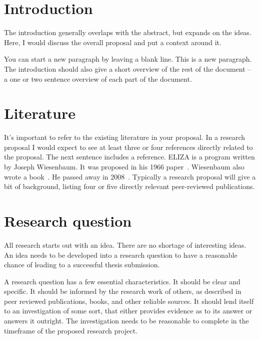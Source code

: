   \section{Introduction}
    The introduction generally overlaps with the abstract, but expands
    on the ideas. Here, I would discuss the overall proposal and put a context
    around it.
    
    You can start a new paragraph by leaving a blank line. This is a new
    paragraph.
    The introduction should also give a short overview of the rest of the
    document -- a one or two sentence overview of each part of the document.

  \section{Literature}
    It's important to refer to the existing literature in your proposal. In a
    research proposal I would expect to see at least three or four references
    directly related to the proposal. The next sentence includes a reference.
    ELIZA is a program written by Joseph Wiesenbaum. It was proposed in his 1966
    paper~\cite{weisenbaumeliza}.
    Wiesenbaum also wrote a book~\cite{weisenbaumcomputerpower}.
    He passed away in 2008~\cite{weisenbaumnytobituary}.
    \label{section:literature}
    Typically a research proposal will give a bit of background, listing four or
    five directly relevant peer-reviewed publications.

  \section{Research question}
    All research starts out with an idea. There are no shortage of interesting 
    ideas. An idea needs to be developed into a research question to have a
    reasonable chance of leading to a successful thesis submission.
    
    A research question has a few essential characteristics. It should be clear 
    and specific. It should be informed by the research work of others, as
    described in peer reviewed publications, books, and other reliable sources.
    It should lend itself to an investigation of some sort, that either provides
    evidence as to its answer or answers it outright. The investigation needs to
    be reasonable to complete in the timeframe of the proposed research project.

